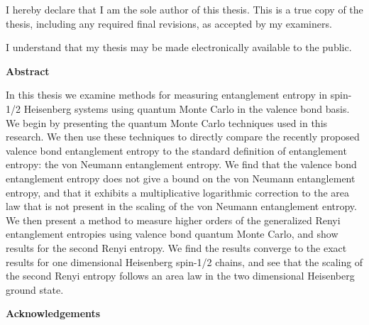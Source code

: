 \cleardoublepage %
 


  \noindent
I hereby declare that I am the sole author of this thesis. This is a true copy of the thesis, including any required final revisions, as accepted by my examiners.

  \bigskip
  
  \noindent
I understand that my thesis may be made electronically available to the public.

\cleardoublepage


\begin{center}\textbf{Abstract}\end{center}

In this thesis we examine methods for measuring entanglement entropy in spin-1/2 Heisenberg systems using quantum Monte Carlo in the valence bond basis.  
We begin by presenting the quantum Monte Carlo techniques used in this research.
We then use these techniques to directly compare the recently proposed valence bond entanglement entropy to the standard definition of entanglement entropy: the von Neumann entanglement entropy. 
We find that the valence bond entanglement entropy does not give a bound on the von Neumann entanglement entropy, and that it exhibits a multiplicative logarithmic correction to the area law that is not present in the scaling of the von Neumann entanglement entropy.
We then present a method to measure higher orders of the generalized Renyi entanglement entropies using valence bond quantum Monte Carlo, and show results for the second Renyi entropy.
We find the results converge to the exact results for one dimensional Heisenberg spin-1/2 chains, and see that the scaling of the second Renyi entropy follows an area law in the two dimensional Heisenberg ground state.

\cleardoublepage


\begin{center}\textbf{Acknowledgements}\end{center}

